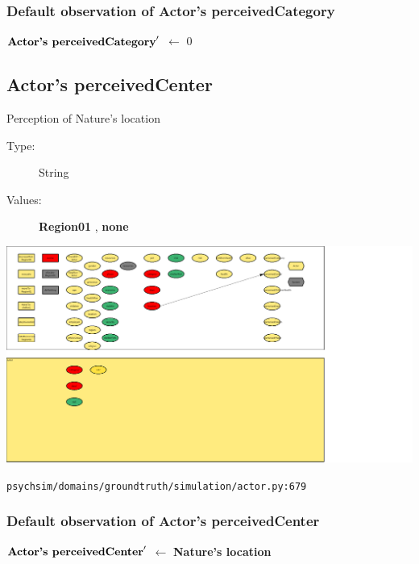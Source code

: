 \documentclass{article}%
\begin{document}
%
\subsubsection{Default observation of Actor's perceivedCategory}%
\label{ssubsec:Default observation of Actor's perceivedCategory}%
\begin{flushleft}%
$\mbox{\textbf{Actor's perceivedCategory}} '$%
$\leftarrow$%
0%
\end{flushleft}

%
\subsection{Actor's perceivedCenter}%
\label{subsec:Actor's perceivedCenter}%
Perception of Nature's location%
\begin{description}%
\item[Type:]%
String%
\item[Values:]%
\textbf{Region01}%
, %
\textbf{none}%
\end{description}%
\includegraphics[width=\textwidth]{images/perceivedCenterOfActor.png}%
\begin{flushleft}%
\verb|psychsim/domains/groundtruth/simulation/actor.py:679|%
\end{flushleft}%
\subsubsection{Default observation of Actor's perceivedCenter}%
\label{ssubsec:Default observation of Actor's perceivedCenter}%
\begin{flushleft}%
$\mbox{\textbf{Actor's perceivedCenter}} '$%
$\leftarrow$%
\textbf{Nature's location}%
\end{flushleft}

%
\end{document}
